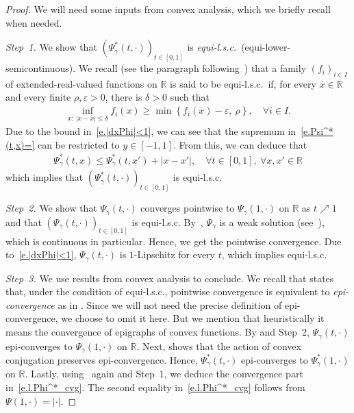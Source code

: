 \documentclass[11pt]{amsart}
\theoremstyle{remark}
\theoremstyle{definition}
\numberwithin{equation}{section}
\numberwithin{proposition}{section}
\numberwithin{figure}{section}
\numberwithin{table}{section}
\newcommand{\R}{\mathbb{R}}
\newcommand{\eps}{\varepsilon}
\renewcommand{\leq}{\leqslant}
\renewcommand{\geq}{\geqslant}
\renewcommand{\bar}{\overline}
\newcommand{\Ll}{\left}
\newcommand{\Rr}{\right}
\newcommand{\1}{\mathbf{1}}
\begin{document}
\begin{proof}
We will need some inputs from convex analysis, which we briefly recall when needed.

\medskip
\noindent\textit{Step~1.}
We show that $(\Psi_\gamma^*(t,\cdot))_{t\in[0,1]}$ is \textit{equi-l.s.c.}\ (equi-lower-semicontinuous). We recall (see the paragraph following~\cite[7.9~Exercise]{rockafellar1998variational}) that a family $(f_i)_{i\in I}$ of extended-real-valued functions on $\R$ is said to be equi-l.s.c.\ if, for every $\bar x\in\R$ and every finite $\rho,\eps>0$, there is $\delta>0$ such that
\begin{align*}
    \inf_{x:\:|x-\bar x|\leq \delta}f_i(x) \geq \min\Ll\{f_i(\bar x) - \eps,\ \rho\Rr\},\quad\forall i\in I.
\end{align*}
Due to the bound in~\eqref{e.|dxPhi|<1}, we can see that the supremum in~\eqref{e.Psi^*(t,x)=} can be restricted to $y\in[-1,1]$. From this, we can deduce that
\begin{align}\label{e.Phi^*<Phi^*+||}
    \Psi_\gamma^*(t,x) \leq \Psi_\gamma^*(t,x') + |x-x'|,\quad\forall t\in[0,1],\ \forall x,x'\in\R
\end{align}
which implies that $(\Psi_\gamma^*(t,\cdot))_{t\in[0,1]}$ is equi-l.s.c.

\medskip
\noindent\textit{Step~2.}
We show that $\Psi_\gamma(t,\cdot)$ converges pointwise to $\Psi_\gamma(1,\cdot)$ on $\R$ as $t\nearrow1$ and that $(\Psi_\gamma(t,\cdot))_{t\in[0,1]}$ is equi-l.s.c.
By~\cite[Proposition~2]{chen2018energy}, $\Psi_\gamma$ is a weak solution (see~\cite[Definition~1]{chen2018energy}), which is continuous in particular. Hence, we get the pointwise convergence. Due to~\eqref{e.|dxPhi|<1}, $\Psi_\gamma(t,\cdot)$ is $1$-Lipschitz for every $t$, which implies equi-l.s.c.

\medskip
\noindent\textit{Step~3.}
We use results from convex analysis to conclude. 
We recall that \cite[7.10~Theorem]{rockafellar1998variational} states that, under the condition of equi-l.s.c., pointwise convergence is equivalent to \textit{epi-convergence} as in \cite[7.1~Definition]{rockafellar1998variational}.
Since we will not need the precise definition of epi-convergence, we choose to omit it here. But we mention that heuristically it means the convergence of epigraphs of convex functions.
By \cite[7.10~Theorem]{rockafellar1998variational} and Step~2, $\Psi_\gamma(t,\cdot)$ epi-converges to $\Psi_\gamma(1,\cdot)$ on $\R$. Next, \cite[11.34~Theorem]{rockafellar1998variational} shows that the action of convex conjugation preserves epi-convergence. Hence, $\Psi_\gamma^*(t,\cdot)$ epi-converges to $\Psi_\gamma^*(1,\cdot)$ on $\R$. Lastly, using~\cite[7.10~Theorem]{rockafellar1998variational} again and Step~1, we deduce the convergence part in~\eqref{e.l.Phi^*_cvg}. The second equality in~\eqref{e.l.Phi^*_cvg} follows from $\Psi(1,\cdot) =|\cdot|$.
\end{proof}
\end{document}

